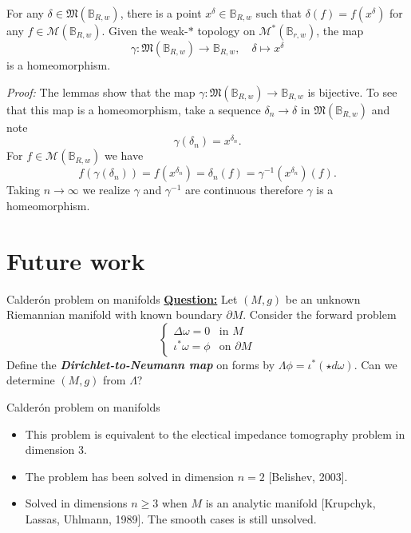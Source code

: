 \documentclass[aspectratio=169,handout]{beamer}
\newcommand\boldgreen[1]{\textcolor{lighter_csu_green}{\emph{\textbf{#1}}}}
\newcommand{\characters}{\mathfrak{M}}
\newcommand{\monogenics}{\mathcal{M}}
\newcommand{\dualmonogenics}{\mathcal{M}^*}
\newcommand{\ball}{\mathbb{B}}
\begin{document}
\begin{frame}{}
\vfill
\begin{theorem}
For any $\delta \in \characters(\ball_{R,w})$, there is a point $x^\delta \in \ball_{R,w}$ such that $\delta(f)=f(x^\delta)$ for any $f\in \monogenics(\ball_{R,w})$. Given the weak-$\ast$ topology on $\dualmonogenics(\ball_{r,w})$, the map
\[
\gamma \colon \characters(\ball_{R,w}) \to \ball_{R,w}, \quad \delta \mapsto x^\delta
\]
is a homeomorphism.
\end{theorem}
\vfill
\end{frame}

\begin{frame}{}
\vfill
\emph{Proof:} The lemmas show that the map $\gamma \colon \characters(\ball_{R,w}) \to \ball_{R,w}$ is bijective. To see that this map is a homeomorphism, take a sequence $\delta_n \to \delta$ in $\characters(\ball_{R,w})$ and note
\[
\gamma(\delta_n)=x^{\delta_n}.
\]
For $f\in \monogenics(\ball_{R,w})$ we have
\[
f(\gamma(\delta_n))=f(x^{\delta_n})=\delta_n(f)=\gamma^{-1}(x^{\delta_n})(f).
\]
Taking $n\to \infty$ we realize $\gamma$ and $\gamma^{-1}$ are continuous therefore $\gamma$ is a homeomorphism.
\vfill
\end{frame}

\section{Future work}

\begin{frame}{Calder\'on problem on manifolds}
\vfill
\textbf{\underline{Question:}} Let $(M,g)$ be an unknown Riemannian manifold with known boundary $\partial M$. Consider the forward problem
\[
\begin{cases}
\Delta \omega = 0 & \textrm{in $M$}\\
\iota^*\omega = \phi & \textrm{on $\partial M$}
\end{cases}
\]
Define the \boldgreen{Dirichlet-to-Neumann map} on forms by $\Lambda\phi = \iota^*(\star d \omega)$. Can we determine $(M,g)$ from $\Lambda$?
\vfill
\end{frame}

\begin{frame}{Calder\'on problem on manifolds}
\vfill
\begin{itemize}
    \item This problem is equivalent to the electical impedance tomography problem in dimension 3. 
    \item The problem has been solved in dimension $n=2$ [Belishev, 2003].
    \item Solved in dimensions $n\geq 3$ when $M$ is an analytic manifold [Krupchyk, Lassas, Uhlmann, 1989]. The smooth cases is still unsolved.
\end{itemize}
\end{frame}
\end{document}
